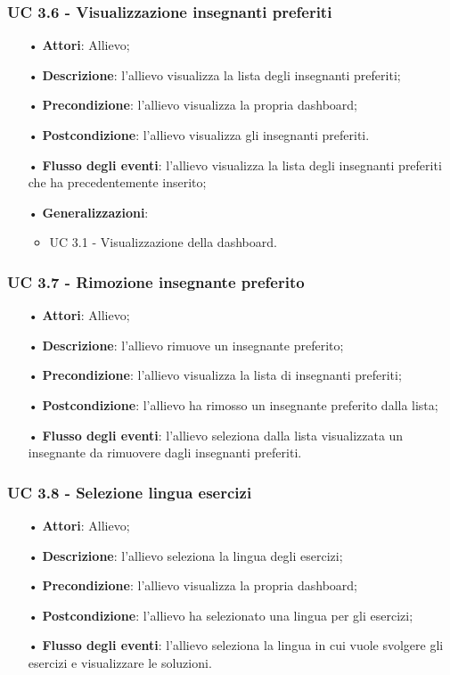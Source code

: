 \subsubsection{UC 3.6 - Visualizzazione insegnanti preferiti}
\begin{itemize}
	\item[•]\textbf{Attori}: Allievo;
	\item[•]\textbf{Descrizione}: l'allievo visualizza la lista degli insegnanti preferiti;
	\item[•]\textbf{Precondizione}: l'allievo visualizza la propria dashboard;
	\item[•]\textbf{Postcondizione}: l'allievo visualizza gli insegnanti preferiti.
	\item[•]\textbf{Flusso degli eventi}: l'allievo visualizza la lista degli insegnanti preferiti che ha precedentemente inserito;
	\item[•]\textbf{Generalizzazioni}:
\begin{itemize}
\item UC 3.1 - Visualizzazione della dashboard.
\end{itemize}
\end{itemize}

\subsubsection{UC 3.7 - Rimozione insegnante preferito}
\begin{itemize}
	\item[•]\textbf{Attori}: Allievo;
	\item[•]\textbf{Descrizione}: l'allievo rimuove un insegnante preferito;
	\item[•]\textbf{Precondizione}: l'allievo visualizza la lista di insegnanti preferiti;
	\item[•]\textbf{Postcondizione}: l'allievo ha rimosso un insegnante preferito dalla lista;
	\item[•]\textbf{Flusso degli eventi}: l'allievo seleziona dalla lista visualizzata un insegnante da rimuovere dagli insegnanti preferiti.
\end{itemize}

\subsubsection{UC 3.8 - Selezione lingua esercizi}
\begin{itemize}
	\item[•]\textbf{Attori}: Allievo;
	\item[•]\textbf{Descrizione}: l'allievo seleziona la lingua degli esercizi;
	\item[•]\textbf{Precondizione}: l'allievo visualizza la propria dashboard;
	\item[•]\textbf{Postcondizione}: l'allievo ha selezionato una lingua per gli esercizi;
	\item[•]\textbf{Flusso degli eventi}: l'allievo seleziona la lingua in cui vuole svolgere gli esercizi e visualizzare le soluzioni.
\end{itemize}

